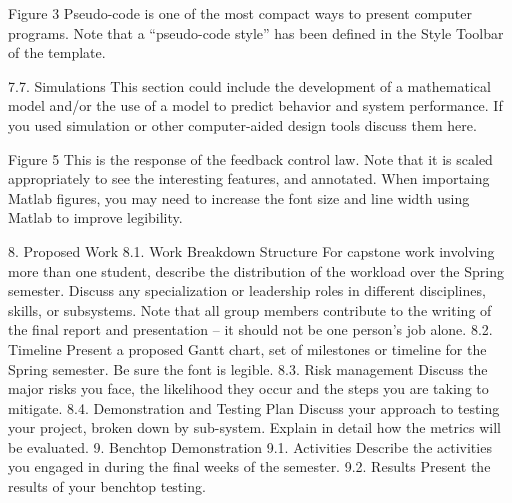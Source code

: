 Figure 3  Pseudo-code is one of the most compact ways to present computer programs.   Note that a “pseudo-code style” has been defined in the Style Toolbar of the template.  

        7.7. Simulations
This section could include the development of a mathematical model and/or the use of a model to predict behavior and system performance.  If you used simulation or other computer-aided design tools discuss them here. 

Figure 5  This is the response of the feedback control law.   Note that it is scaled appropriately to see the interesting features, and annotated.   When importaing Matlab figures, you may need to increase the font size and line width using Matlab to improve legibility.

    8. Proposed Work
        8.1. Work Breakdown Structure
For capstone work involving more than one student, describe the distribution of the workload over the Spring semester. Discuss any specialization or leadership roles in different disciplines, skills, or subsystems. Note that all group members contribute to the writing of the final report and presentation – it should not be one person’s job alone.  
        8.2. Timeline
Present a proposed Gantt chart, set of milestones or timeline for the Spring semester.   Be sure the font is legible. 
        8.3. Risk management
Discuss the major risks you face, the likelihood they occur and the steps you are taking to mitigate. 
        8.4. Demonstration and Testing Plan
Discuss your approach to testing your project, broken down by sub-system.
Explain in detail how the metrics will be evaluated. 
    9. Benchtop Demonstration
        9.1. Activities
Describe the activities you engaged in during the final weeks of the semester.
        9.2. Results 
Present the results of your benchtop testing. 


